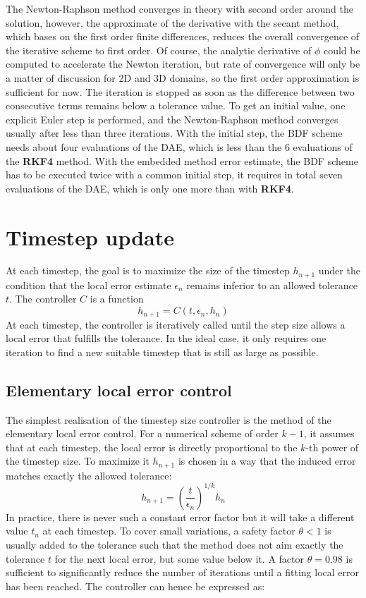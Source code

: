 The Newton-Raphson method converges in theory with second order around the solution, however, the approximate of the derivative with the secant method, which bases on the first order finite differences, reduces the overall convergence of the iterative scheme to first order. Of course, the analytic derivative of $\phi$ could be computed to accelerate the Newton iteration, but rate of convergence will only be a matter of discussion for 2D and 3D domains, so the first order approximation is sufficient for now. The iteration is stopped as soon as the difference between two consecutive terms remains below a tolerance value. To get an initial value, one explicit Euler step is performed, and the Newton-Raphson method converges usually after less than three iterations. With the initial step, the BDF scheme needs about four evaluations of the DAE, which is less than the 6 evaluations of the \textbf{RKF4} method. With the embedded method error estimate, the BDF scheme has to be executed twice with a common initial step, it requires in total seven evaluations of the DAE, which is only one more than with \textbf{RKF4}.

\section{Timestep update}
At each timestep, the goal is to maximize the size of the timestep $h_{n+1}$ under the condition that the local error  estimate $\epsilon_n$ remains inferior to an allowed tolerance $t$. The controller $C$ is a function 
\begin{equation}
	h_{n+1} = C(t, \epsilon_n, h_n)
\end{equation}
At each timestep, the controller is iteratively called until the step size allows a local error that fulfills the tolerance. In the ideal case, it only requires one iteration to find a new suitable timestep that is still as large as possible.

\subsection{Elementary local error control}
The simplest realisation of the timestep size controller is the method of the elementary local error control. For a numerical scheme of order $k-1$, it assumes that at each timestep, the local error is directly proportional to the $k$-th power of the timestep size. To maximize it $h_{n+1}$ is chosen in a way that the induced error matches exactly the allowed tolerance:
\begin{equation}
    h_{n+1} = \left(\frac{t}{\epsilon_n}\right)^{1/k}h_n
\end{equation}
In practice, there is never such a constant error factor but it will take a different value $t_n$ at each timestep. To cover small variations, a safety factor $\theta < 1$ is usually added to the tolerance such that the method does not aim exactly the tolerance $t$ for the next local error, but some value below it. A factor $\theta=0.98$ is sufficient to significantly reduce the number of iterations until a fitting local error has been reached. The controller can hence be expressed as:

